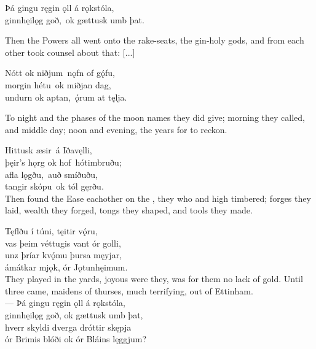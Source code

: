 \bva Þá gingu ręgin ǫll \hld á rǫkstóla, \\%
ginnhęilǫg goð, \hld ok gættusk umb þat.\footnotemark[1] \\%

\bvb Then the Powers all went onto the rake-seats, the gin-holy gods, and from each other took counsel about that: [...]

\bva Nótt ok niðjum \hld nǫfn of gǫ́fu, \\%
morgin hétu \hld ok miðjan dag, \\%
undurn ok aptan, \hld ǫ́rum at tęlja.\footnotemark[22] \\%

\bvb To night and the phases of the moon names they did give; morning they called, and middle day; noon and evening, the years for to reckon.

\bva Hittusk æsir \hld á Iðavęlli, \\%
þęir’s hǫrg ok hof \hld hótimbruðu; \\%
afla lǫgðu, \hld auð smíðuðu, \\%
tangir skópu \hld ok tól gęrðu.\\%

\bvb Then found the Ease eachother on the , they who  and  high timbered; forges they laid, wealth they forged, tongs they shaped, and tools they made.

\bva Tęflðu í túni, \hld tęitir vǫ́ru, \\%
vas þeim véttugis \hld vant ór golli, \\%
unz þríar kvǫ́mu \hld þursa męyjar, \\%
ámátkar mjǫk, \hld ór Jǫtunhęimum. \\%

\bvb They played  in the yards, joyous were they, was for them no lack of gold. Until three came, maidens of thurses, much terrifying, out of Ettinham.\footnotemark[1]
\\%

\bva — Þá gingu ręgin ǫll \hld á rǫkstóla, \\%
ginnhęilǫg goð, \hld ok gættusk umb þat, \\%
hverr skyldi dverga \hld dróttir skępja \\%
ór Brimis blóði \hld ok ór Bláins lęggjum?\footnotemark[22] \\%
\\%

